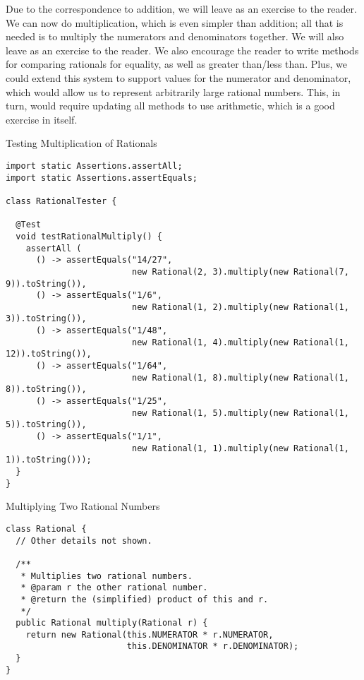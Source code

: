 Due to the correspondence to addition, we will leave  as an exercise to the reader. We can now do multiplication, which is even simpler than addition; all that is needed is to multiply the numerators and denominators together. We will also leave  as an exercise to the reader. We also encourage the reader to write methods for comparing rationals for equality, as well as greater than/less than. Plus, we could extend this system to support  values for the numerator and denominator, which would allow us to represent arbitrarily large rational numbers. This, in turn, would require updating all methods to use  arithmetic, which is a good exercise in itself.

\begin{cl}{Testing Multiplication of Rationals}
\begin{lstlisting}[language=MyJava]
import static Assertions.assertAll;
import static Assertions.assertEquals;

class RationalTester {

  @Test
  void testRationalMultiply() {
    assertAll (
      () -> assertEquals("14/27", 
                         new Rational(2, 3).multiply(new Rational(7, 9)).toString()),
      () -> assertEquals("1/6", 
                         new Rational(1, 2).multiply(new Rational(1, 3)).toString()),
      () -> assertEquals("1/48", 
                         new Rational(1, 4).multiply(new Rational(1, 12)).toString()),
      () -> assertEquals("1/64", 
                         new Rational(1, 8).multiply(new Rational(1, 8)).toString()),
      () -> assertEquals("1/25", 
                         new Rational(1, 5).multiply(new Rational(1, 5)).toString()),
      () -> assertEquals("1/1", 
                         new Rational(1, 1).multiply(new Rational(1, 1)).toString()));
  }
}
\end{lstlisting}
\end{cl}

\begin{cl}{Multiplying Two Rational Numbers}
\begin{lstlisting}[language=MyJava]
class Rational {
  // Other details not shown.

  /**
   * Multiplies two rational numbers.
   * @param r the other rational number.
   * @return the (simplified) product of this and r.
   */
  public Rational multiply(Rational r) {
    return new Rational(this.NUMERATOR * r.NUMERATOR, 
                        this.DENOMINATOR * r.DENOMINATOR);
  }
}
\end{lstlisting}
\end{cl}

